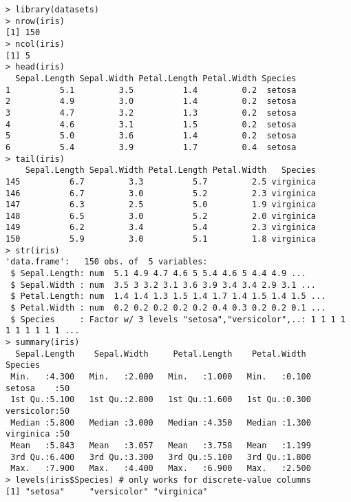 \begin{lstlisting}
> library(datasets)
> nrow(iris)
[1] 150
> ncol(iris)
[1] 5
> head(iris)
  Sepal.Length Sepal.Width Petal.Length Petal.Width Species
1          5.1         3.5          1.4         0.2  setosa
2          4.9         3.0          1.4         0.2  setosa
3          4.7         3.2          1.3         0.2  setosa
4          4.6         3.1          1.5         0.2  setosa
5          5.0         3.6          1.4         0.2  setosa
6          5.4         3.9          1.7         0.4  setosa
> tail(iris)
    Sepal.Length Sepal.Width Petal.Length Petal.Width   Species
145          6.7         3.3          5.7         2.5 virginica
146          6.7         3.0          5.2         2.3 virginica
147          6.3         2.5          5.0         1.9 virginica
148          6.5         3.0          5.2         2.0 virginica
149          6.2         3.4          5.4         2.3 virginica
150          5.9         3.0          5.1         1.8 virginica
> str(iris)
'data.frame':	150 obs. of  5 variables:
 $ Sepal.Length: num  5.1 4.9 4.7 4.6 5 5.4 4.6 5 4.4 4.9 ...
 $ Sepal.Width : num  3.5 3 3.2 3.1 3.6 3.9 3.4 3.4 2.9 3.1 ...
 $ Petal.Length: num  1.4 1.4 1.3 1.5 1.4 1.7 1.4 1.5 1.4 1.5 ...
 $ Petal.Width : num  0.2 0.2 0.2 0.2 0.2 0.4 0.3 0.2 0.2 0.1 ...
 $ Species     : Factor w/ 3 levels "setosa","versicolor",..: 1 1 1 1 1 1 1 1 1 1 ...
> summary(iris)
  Sepal.Length    Sepal.Width     Petal.Length    Petal.Width          Species
 Min.   :4.300   Min.   :2.000   Min.   :1.000   Min.   :0.100   setosa    :50
 1st Qu.:5.100   1st Qu.:2.800   1st Qu.:1.600   1st Qu.:0.300   versicolor:50
 Median :5.800   Median :3.000   Median :4.350   Median :1.300   virginica :50
 Mean   :5.843   Mean   :3.057   Mean   :3.758   Mean   :1.199
 3rd Qu.:6.400   3rd Qu.:3.300   3rd Qu.:5.100   3rd Qu.:1.800
 Max.   :7.900   Max.   :4.400   Max.   :6.900   Max.   :2.500
> levels(iris$Species) # only works for discrete-value columns
[1] "setosa"     "versicolor" "virginica"
\end{lstlisting}

